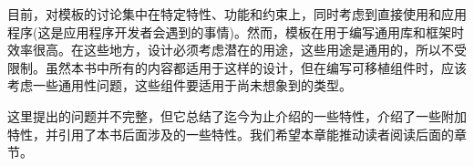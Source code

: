 目前，对模板的讨论集中在特定特性、功能和约束上，同时考虑到直接使用和应用程序(这是应用程序开发者会遇到的事情)。然而，模板在用于编写通用库和框架时效率很高。在这些地方，设计必须考虑潜在的用途，这些用途是通用的，所以不受限制。虽然本书中所有的内容都适用于这样的设计，但在编写可移植组件时，应该考虑一些通用性问题，这些组件要适用于尚未想象到的类型。

这里提出的问题并不完整，但它总结了迄今为止介绍的一些特性，介绍了一些附加特性，并引用了本书后面涉及的一些特性。我们希望本章能推动读者阅读后面的章节。